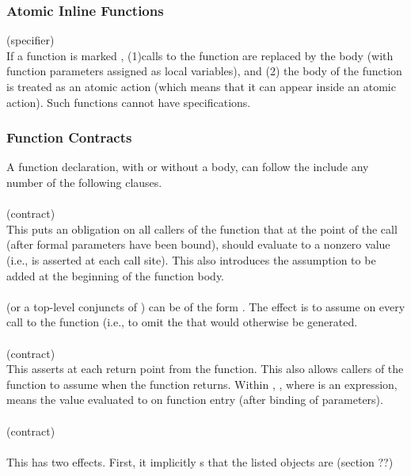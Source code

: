 \documentclass[preprint,nocopyrightspace]{sigplanconf}
\begin{document}
{{{\subsubsection{Atomic Inline Functions}

 (specifier)\\
If a function is marked , (1)calls to the
function are replaced by the body (with function parameters assigned
as local variables), and (2) the body of the function is treated as an
atomic action (which means that it can appear inside an atomic
action). Such functions cannot have specifications.

\subsubsection{Function Contracts}
A function declaration, with or without a body, can follow the
include any number of the following clauses. 
\\\\
 (contract)\\
This puts  an obligation on  all callers of  the function that  at the
point of the  call (after formal parameters have  been bound), 
should evaluate to a nonzero  value (i.e.,  is asserted at each
call site). This also introduces  the assumption to be added at
the beginning of the function body. 
\\\\
 (or a top-level conjuncts of ) can be of the
form . The effect is to assume  on every call
to the function (i.e., to omit the  that would
otherwise be generated.
\\\\
 (contract)\\
This asserts  at each return point from the function. This also
allows callers of the function to assume  when the function
returns. Within , , where  is an
expression, means the value  evaluated to on function entry
(after binding of parameters).
\\\\
 (contract) \\
\\
This has two effects. First, it implicitly s that the
listed objects are \vcc{\writable} (section ??)
}}}
\end{document}
